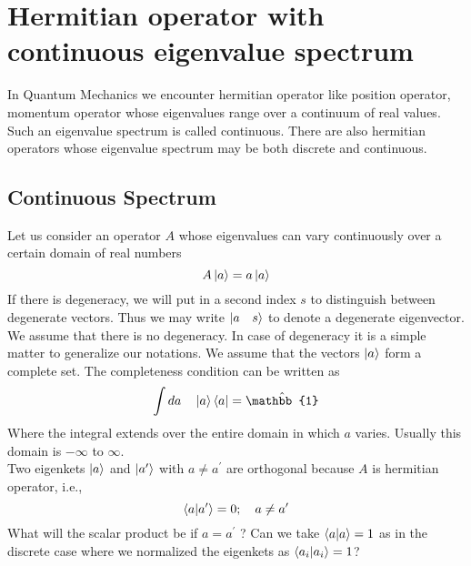 	
	
	\section{Hermitian operator with continuous eigenvalue spectrum}
	In Quantum Mechanics we encounter hermitian operator like position operator, momentum operator whose eigenvalues range over a continuum of real values. Such an eigenvalue spectrum is called continuous. There are also hermitian operators whose eigenvalue spectrum may be both discrete and continuous.
	
		\subsection{Continuous Spectrum}
		Let us consider an operator $A$ whose eigenvalues can vary continuously over a certain domain of real numbers
		\begin{equation}
			A \ket{a} = a \ket{a}
			\label{chapter5.eqn9-eigenvalue}
		\end{equation}
		If there is degeneracy, we will put in a second index $s$ to distinguish between degenerate vectors. Thus we may write $\ket{a\quad s}$ to denote a degenerate eigenvector. We assume that there is no degeneracy. In case of degeneracy it is a simple matter to generalize our notations. We assume that the vectors $\ket{a}$ form a complete set. The completeness condition can be written as
		\begin{equation}
			\int da \quad \ket{a}\bra{a} = \hat{\mathbb{1}}
			\label{chapter5.eqn10-completenss-continuous}
		\end{equation}
		Where the integral extends over the entire domain in which $a$ varies. Usually this domain is $-\infty$ to $\infty$.\\
		
		Two eigenkets $\ket{a}$ and $\ket{a^\prime}$ with $a\neq a^\prime$ are orthogonal because $A$ is  hermitian operator, i.e.,
		\begin{equation}
			\braket{a}{a^\prime} = 0 ; \quad  a \neq a^\prime
			\label{chapter5.eqn11-orthogonal-continuous}
		\end{equation}
		What will the scalar product be if $a=a^\prime$ ? Can we take $\braket{a}{a} = 1$ as in the discrete case where we normalized the eigenkets as $\braket{a_i}{a_i} = 1$?\\
		
